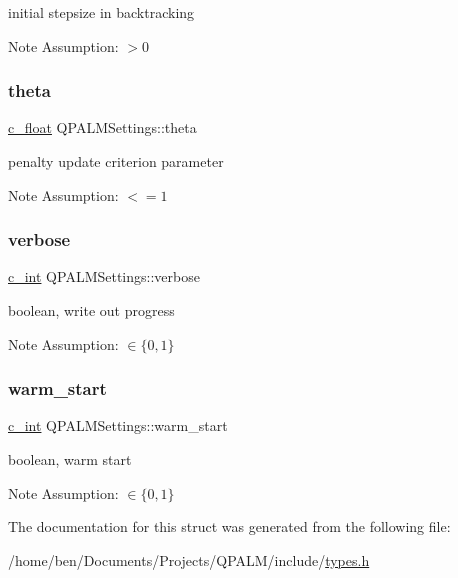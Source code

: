 initial stepsize in backtracking 

\begin{DoxyNote}{Note}
Assumption\+: $>0$ 
\end{DoxyNote}
\mbox{\label{structQPALMSettings_a5823b01f86bd67a2c5fac3f03749db2c}} 
\subsubsection{\texorpdfstring{theta}{theta}}
{\footnotesize\ttfamily \mbox{\hyperlink{global__opts_8h_a7f1a9fda95e52979658c20a0d134fb15}{c\+\_\+float}} Q\+P\+A\+L\+M\+Settings\+::theta}



penalty update criterion parameter 

\begin{DoxyNote}{Note}
Assumption\+: $<=1$ 
\end{DoxyNote}
\mbox{\label{structQPALMSettings_a9ea17b9d594959ee2d589ef11ccd2dfd}} 
\subsubsection{\texorpdfstring{verbose}{verbose}}
{\footnotesize\ttfamily \mbox{\hyperlink{global__opts_8h_aa3217a0f49d3e52b74e9dd830c44472f}{c\+\_\+int}} Q\+P\+A\+L\+M\+Settings\+::verbose}



boolean, write out progress 

\begin{DoxyNote}{Note}
Assumption\+: $\in \{0,1\}$ 
\end{DoxyNote}
\mbox{\label{structQPALMSettings_a1e117619c60003cf492dc998af7ce16e}} 
\subsubsection{\texorpdfstring{warm\_start}{warm\_start}}
{\footnotesize\ttfamily \mbox{\hyperlink{global__opts_8h_aa3217a0f49d3e52b74e9dd830c44472f}{c\+\_\+int}} Q\+P\+A\+L\+M\+Settings\+::warm\+\_\+start}



boolean, warm start 

\begin{DoxyNote}{Note}
Assumption\+: $\in \{0,1\}$ 
\end{DoxyNote}


The documentation for this struct was generated from the following file\+:\begin{DoxyCompactItemize}
\item 
/home/ben/\+Documents/\+Projects/\+Q\+P\+A\+L\+M/include/\mbox{\hyperlink{types_8h}{types.\+h}}\end{DoxyCompactItemize}

